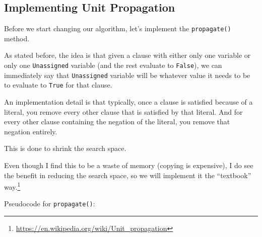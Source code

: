 \subsection{Implementing Unit Propagation}

Before we start changing our algorithm, let's implement the
\texttt{propagate()} method.

As stated before, the idea is that given a clause with either only one variable
or only one \texttt{Unassigned} variable (and the rest evaluate to
\texttt{False}), we can immediately say that \texttt{Unassigned} variable will
be whatever value it needs to be to evaluate to \texttt{True} for that clause.

An implementation detail is that typically, once a clause is satisfied because
of a literal, you remove every other clause that is satisfied by that literal.
And for every other clause containing the negation of the literal, you remove
that negation entirely.

This is done to shrink the search space.

Even though I find this to be a waste of memory (copying is expensive), I do
see the benefit in reducing the search space, so we will implement it the
``textbook'' way.\footnote{\url{https://en.wikipedia.org/wiki/Unit_propagation}}

Pseudocode for \texttt{propagate()}:

